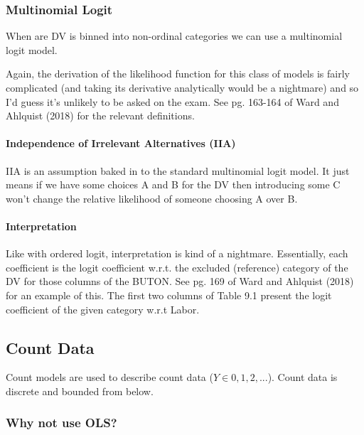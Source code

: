 \documentclass[
]{article}
\begin{document}
\hypertarget{multinomial-logit}{%
\subsubsection{Multinomial Logit}\label{multinomial-logit}}

When are DV is binned into non-ordinal categories we can use a
multinomial logit model.

Again, the derivation of the likelihood function for this class of
models is fairly complicated (and taking its derivative analytically
would be a nightmare) and so I'd guess it's unlikely to be asked on the
exam. See pg. 163-164 of Ward and Ahlquist (2018) for the relevant
definitions.

\hypertarget{independence-of-irrelevant-alternatives-iia}{%
\paragraph{Independence of Irrelevant Alternatives
(IIA)}\label{independence-of-irrelevant-alternatives-iia}}

IIA is an assumption baked in to the standard multinomial logit model.
It just means if we have some choices A and B for the DV then
introducing some C won't change the relative likelihood of someone
choosing A over B.

\hypertarget{interpretation}{%
\paragraph{Interpretation}\label{interpretation}}

Like with ordered logit, interpretation is kind of a nightmare.
Essentially, each coefficient is the logit coefficient w.r.t. the
excluded (reference) category of the DV for those columns of the BUTON.
See pg. 169 of Ward and Ahlquist (2018) for an example of this. The
first two columns of Table 9.1 present the logit coefficient of the
given category w.r.t Labor.

\hypertarget{count-data}{%
\subsection{Count Data}\label{count-data}}

Count models are used to describe count data (\(Y\in{0,1,2, . . .}\)).
Count data is discrete and bounded from below.

\hypertarget{why-not-use-ols}{%
\subsubsection{Why not use OLS?}\label{why-not-use-ols}}
\end{document}
